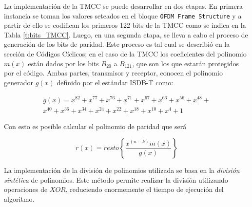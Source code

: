 La implementación de la TMCC se puede desarrollar en dos etapas. En primera instancia se toman los valores seteados en el bloque \verb|OFDM Frame Structure| y a partir de ello se codifican los primeros 122 bits de la TMCC como se indica en la Tabla \ref{t:bits_TMCC}. Luego, en una segunda etapa, se lleva a cabo el proceso de generación de los bits de paridad. Este proceso es tal cual se describió en la sección de Códigos Cíclicos; en el caso de la TMCC los coeficientes del polinomio $m(x)$ están dados por los bits $B_{20}$ a $B_{121}$, que son los que estarán protegidos por el código. Ambas partes, transmisor y receptor, conocen el polinomio generador $g(x)$ definido por el estándar ISDB-T como:

\begin{equation}
\begin{split}
g(x) = x^{82}+x^{77}+x^{76}+x^{71}+x^{67}+x^{66}+x^{56}+x^{48}+\\x^{40}+x^{36}+x^{34}+x^{24}+x^{22}+x^{18}+x^{10}+x^{4}+1
\end{split}
\end{equation}

Con esto es posible calcular el polinomio de paridad que será 

\begin{equation}
r(x)= resto \left\{ \dfrac{x^{(n-k)}m(x)}{g(x)} \right\}
\end{equation}

La implementación de la división de polinomios utilizada se basa en la \textit{división sintética} de polinomios. Este método permite realizar la división utilizando operaciones de $XOR$, reduciendo enormemente el tiempo de ejecución del algoritmo.


